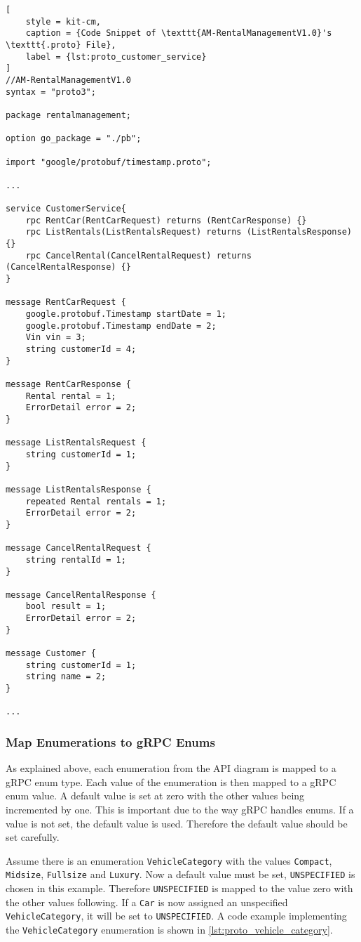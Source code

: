 \begin{lstlisting}[
    style = kit-cm,
    caption = {Code Snippet of \texttt{AM-RentalManagementV1.0}'s \texttt{.proto} File},
    label = {lst:proto_customer_service}
]
//AM-RentalManagementV1.0
syntax = "proto3";

package rentalmanagement;

option go_package = "./pb";

import "google/protobuf/timestamp.proto";

...

service CustomerService{
    rpc RentCar(RentCarRequest) returns (RentCarResponse) {}
    rpc ListRentals(ListRentalsRequest) returns (ListRentalsResponse) {}
    rpc CancelRental(CancelRentalRequest) returns (CancelRentalResponse) {}
}

message RentCarRequest {
    google.protobuf.Timestamp startDate = 1;
    google.protobuf.Timestamp endDate = 2;
    Vin vin = 3;
    string customerId = 4;
}

message RentCarResponse {
    Rental rental = 1;
    ErrorDetail error = 2;
}

message ListRentalsRequest {
    string customerId = 1;
}

message ListRentalsResponse {
    repeated Rental rentals = 1;
    ErrorDetail error = 2;
}

message CancelRentalRequest {
    string rentalId = 1;
}

message CancelRentalResponse {
    bool result = 1;
    ErrorDetail error = 2;
}

message Customer {
    string customerId = 1;
    string name = 2;
}

...
\end{lstlisting}
\subsubsection*{Map Enumerations to gRPC Enums}
As explained above, each enumeration from the API diagram is mapped to a gRPC enum type.
Each value of the enumeration is then mapped to a gRPC enum value.
A default value is set at zero with the other values being incremented by one.
This is important due to the way gRPC handles enums.
If a value is not set, the default value is used.
Therefore the default value should be set carefully.

Assume there is an enumeration \texttt{VehicleCategory} with the values \texttt{Compact}, \texttt{Midsize}, \texttt{Fullsize} and \texttt{Luxury}.
Now a default value must be set, \texttt{UNSPECIFIED} is chosen in this example.
Therefore \texttt{UNSPECIFIED} is mapped to the value zero with the other values following.
If a \texttt{Car} is now assigned an unspecified \texttt{VehicleCategory}, it will be set to \texttt{UNSPECIFIED}.
A code example implementing the \texttt{VehicleCategory} enumeration is shown in \autoref{lst:proto_vehicle_category}.

